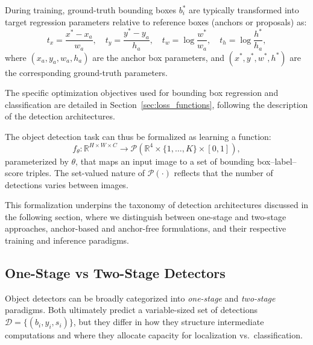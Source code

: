During training, ground-truth bounding boxes $b_i^\ast$ are typically transformed into target regression parameters relative to reference boxes (anchors or proposals) as:
$$
t_x = \frac{x^\ast - x_a}{w_a}, \quad
t_y = \frac{y^\ast - y_a}{h_a}, \quad
t_w = \log \frac{w^\ast}{w_a}, \quad
t_h = \log \frac{h^\ast}{h_a},
$$
where $(x_a, y_a, w_a, h_a)$ are the anchor box parameters, and $(x^\ast, y^\ast, w^\ast, h^\ast)$ are the corresponding ground-truth parameters.

The specific optimization objectives used for bounding box regression and classification are detailed in Section~\ref{sec:loss_functions}, following the description of the detection architectures.

The object detection task can thus be formalized as learning a function:
$$
f_\theta: \mathbb{R}^{H \times W \times C} \to \mathcal{P}(\mathbb{R}^4 \times \{1, \dots, K\} \times [0,1]),
$$
parameterized by $\theta$, that maps an input image to a set of bounding box--label--score triples.
The set-valued nature of $\mathcal{P}(\cdot)$ reflects that the number of detections varies between images.

This formalization underpins the taxonomy of detection architectures discussed in the following section, where we distinguish between one-stage and two-stage approaches, anchor-based and anchor-free formulations, and their respective training and inference paradigms.

\subsection{One-Stage vs Two-Stage Detectors}

Object detectors can be broadly categorized into \emph{one-stage} and \emph{two-stage} paradigms. Both ultimately predict a variable-sized set of detections $\mathcal{D} = \{(b_i, y_i, s_i)\}$, but they differ in how they structure intermediate computations and where they allocate capacity for localization vs.\ classification.

